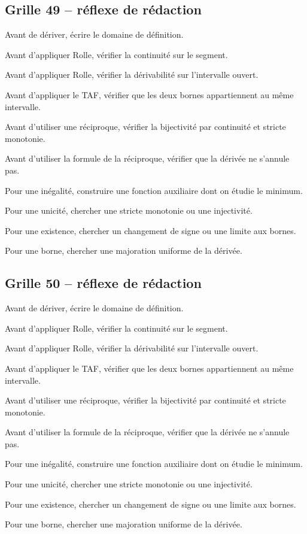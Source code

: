 \documentclass[11pt,a4paper]{article}
\begin{document}
\subsection*{Grille 49 -- réflexe de rédaction}

\begin{methodebox}

Avant de dériver, écrire le domaine de définition.

Avant d'appliquer Rolle, vérifier la continuité sur le segment.

Avant d'appliquer Rolle, vérifier la dérivabilité sur l'intervalle ouvert.

Avant d'appliquer le TAF, vérifier que les deux bornes appartiennent au même intervalle.

Avant d'utiliser une réciproque, vérifier la bijectivité par continuité et stricte monotonie.

Avant d'utiliser la formule de la réciproque, vérifier que la dérivée ne s'annule pas.

Pour une inégalité, construire une fonction auxiliaire dont on étudie le minimum.

Pour une unicité, chercher une stricte monotonie ou une injectivité.

Pour une existence, chercher un changement de signe ou une limite aux bornes.

Pour une borne, chercher une majoration uniforme de la dérivée.

\end{methodebox}

\subsection*{Grille 50 -- réflexe de rédaction}

\begin{methodebox}

Avant de dériver, écrire le domaine de définition.

Avant d'appliquer Rolle, vérifier la continuité sur le segment.

Avant d'appliquer Rolle, vérifier la dérivabilité sur l'intervalle ouvert.

Avant d'appliquer le TAF, vérifier que les deux bornes appartiennent au même intervalle.

Avant d'utiliser une réciproque, vérifier la bijectivité par continuité et stricte monotonie.

Avant d'utiliser la formule de la réciproque, vérifier que la dérivée ne s'annule pas.

Pour une inégalité, construire une fonction auxiliaire dont on étudie le minimum.

Pour une unicité, chercher une stricte monotonie ou une injectivité.

Pour une existence, chercher un changement de signe ou une limite aux bornes.

Pour une borne, chercher une majoration uniforme de la dérivée.

\end{methodebox}
\end{document}
